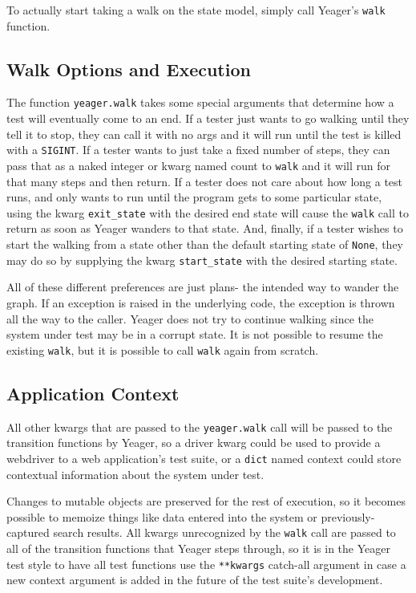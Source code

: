 To actually start taking a walk on the state model, simply call Yeager's \texttt{walk} function.

\subsection{Walk Options and Execution}
The function \texttt{yeager.walk} takes some special arguments that determine how a test will eventually come to an end. If a tester just wants to go walking until they tell it to stop, they can call it with no args and it will run until the test is killed with a \texttt{SIGINT}. If a tester wants to just take a fixed number of steps, they can pass that as a naked integer or kwarg named count to \texttt{walk} and it will run for that many steps and then return. If a tester does not care about how long a test runs, and only wants to run until the program gets to some particular state, using the kwarg \texttt{exit\_state} with the desired end state will cause the \texttt{walk} call to return as soon as Yeager wanders to that state. And, finally, if a tester wishes to start the walking from a state other than the default starting state of \texttt{None}, they may do so by supplying the kwarg \texttt{start\_state} with the desired starting state.

All of these different preferences are just plans- the intended way to wander the graph. If an exception is raised in the underlying code, the exception is thrown all the way to the caller. Yeager does not try to continue walking since the system under test may be in a corrupt state. It is not possible to resume the existing \texttt{walk}, but it is possible to call \texttt{walk} again from scratch.

\subsection{Application Context}
All other kwargs that are passed to the \texttt{yeager.walk} call will be passed to the transition functions by Yeager, so a driver kwarg could be used to provide a webdriver to a web application's test suite, or a \texttt{dict} named context could store contextual information about the system under test.

Changes to mutable objects are preserved for the rest of execution, so it becomes possible to memoize things like data entered into the system or previously-captured search results. All kwargs unrecognized by the \texttt{walk} call are passed to all of the transition functions that Yeager steps through, so it is in the Yeager test style to have all test functions use the \texttt{**kwargs} catch-all argument in case a new context argument is added in the future of the test suite's development.

